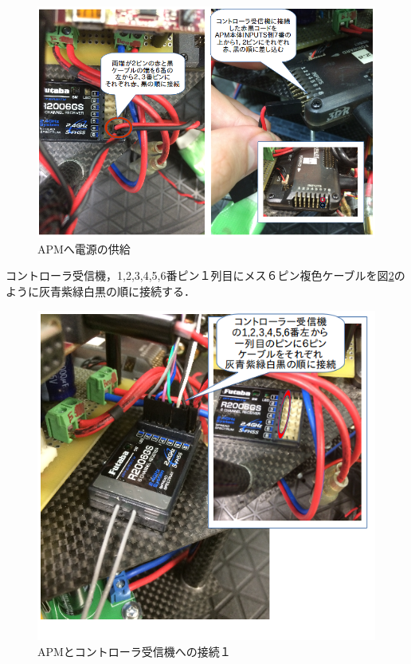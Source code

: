 \documentclass[12pt,oneside]{sotsuken_paper}
\begin{document}
\begin{figure}[H]
\begin{center}
\includegraphics[width=140mm]{img/setuzoku2.png}
\end{center}
\caption{APMへ電源の供給}
\label{fig:setuzoku2}
\end{figure}

コントローラ受信機，1,2,3,4,5,6番ピン１列目にメス６ピン複色ケーブルを図\ref{fig:setuzoku3}のように灰青紫緑白黒の順に接続する．\\

\begin{figure}[H]
\begin{center}
\includegraphics[width=140mm]{img/setuzoku3.png}
\end{center}
\caption{APMとコントローラ受信機への接続１}
\label{fig:setuzoku3}
\end{figure}
\end{document}
